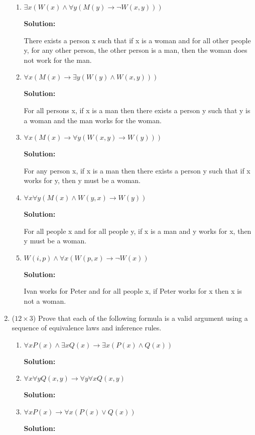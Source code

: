 \documentclass[12pt]{article}
\begin{document}
\begin{enumerate}
\begin{enumerate}
\item
$\exists x(W(x) \land \forall y (M(y) \to \lnot W(x,y)))$

{\bf Solution:}

There exists a person x such that if x is a woman and for all other people y, for any other person, the other person is a man, then the woman does not work for the man.

\item
$\forall x (M(x)\to \exists y (W(y) \land W(x,y)))$

{\bf Solution:}

For all persons x, if x is a man then there exists a person y such that y is a woman and the man works for the woman.

\item
$\forall x (M(x) \to \forall y (W(x,y) \to W(y)) )$

{\bf Solution:}

For any person x, if x is a man then there exists a person y such that if x works for y, then y must be a woman.

\item
$\forall x \forall y (M(x) \land W(y,x) \to W(y))$

{\bf Solution:}

For all people x and for all people y, if x is a man and y works for x, then y must be a woman.

\item
$W(i,p) \land \forall x (W(p,x) \to \lnot W(x))$

{\bf Solution:}

Ivan works for Peter and for all people x, if Peter works for x then x is not a woman.

\end{enumerate}



\newpage

\item ($12 \times 3$)
Prove that each of the following formula is a valid argument using a sequence of equivalence laws and inference rules.
\begin{enumerate}

\item
$\forall x P(x) \land \exists x Q(x) \to \exists x(P(x) \land Q(x))$

{\bf Solution:}

\newpage

\item
$\forall x \forall y Q(x,y) \to \forall y \forall x Q(x,y)$

{\bf Solution:}
\newpage

\item
$\forall x P(x) \to \forall x(P(x) \lor Q(x))$

{\bf Solution:}
\newpage

\end{enumerate}

\end{enumerate}
\end{document}
